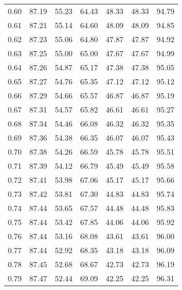 \begin{tabular}{|c|c|c|c|c|c|c|}
      0.60 &     87.19 &     55.23 &      64.43 &   48.33 &      48.33 &         94.79 \\
      0.61 &     87.21 &     55.14 &      64.60 &   48.09 &      48.09 &         94.85 \\
      0.62 &     87.23 &     55.06 &      64.80 &   47.87 &      47.87 &         94.92 \\
      0.63 &     87.25 &     55.00 &      65.00 &   47.67 &      47.67 &         94.99 \\
      0.64 &     87.26 &     54.87 &      65.17 &   47.38 &      47.38 &         95.05 \\
      0.65 &     87.27 &     54.76 &      65.35 &   47.12 &      47.12 &         95.12 \\
      0.66 &     87.29 &     54.66 &      65.57 &   46.87 &      46.87 &         95.19 \\
      0.67 &     87.31 &     54.57 &      65.82 &   46.61 &      46.61 &         95.27 \\
      0.68 &     87.34 &     54.46 &      66.08 &   46.32 &      46.32 &         95.35 \\
      0.69 &     87.36 &     54.38 &      66.35 &   46.07 &      46.07 &         95.43 \\
      0.70 &     87.38 &     54.26 &      66.59 &   45.78 &      45.78 &         95.51 \\
      0.71 &     87.39 &     54.12 &      66.79 &   45.49 &      45.49 &         95.58 \\
      0.72 &     87.41 &     53.98 &      67.06 &   45.17 &      45.17 &         95.66 \\
      0.73 &     87.42 &     53.81 &      67.30 &   44.83 &      44.83 &         95.74 \\
      0.74 &     87.44 &     53.65 &      67.57 &   44.48 &      44.48 &         95.83 \\
      0.75 &     87.44 &     53.42 &      67.85 &   44.06 &      44.06 &         95.92 \\
      0.76 &     87.44 &     53.16 &      68.08 &   43.61 &      43.61 &         96.00 \\
      0.77 &     87.44 &     52.92 &      68.35 &   43.18 &      43.18 &         96.09 \\
      0.78 &     87.45 &     52.68 &      68.67 &   42.73 &      42.73 &         96.19 \\
      0.79 &     87.47 &     52.44 &      69.09 &   42.25 &      42.25 &         96.31 \\

\end{tabular}
